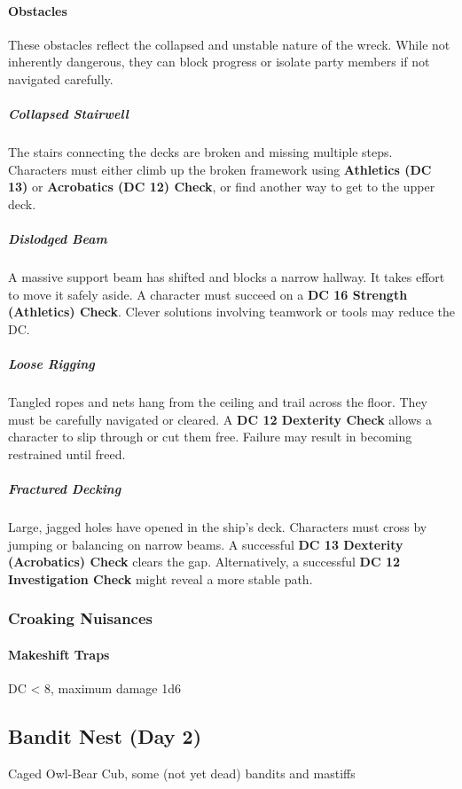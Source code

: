{\entryfont \paragraph*{Obstacles} These obstacles reflect the collapsed and unstable nature of the wreck. While not inherently dangerous, they can block progress or isolate party members if not navigated carefully.
\subparagraph*{Collapsed Stairwell} The stairs connecting the decks are broken and missing multiple steps. Characters must either climb up the broken framework using \textbf{Athletics (DC 13)} or \textbf{Acrobatics (DC 12) Check}, or find another way to get to the upper deck.
\subparagraph*{Dislodged Beam} A massive support beam has shifted and blocks a narrow hallway. It takes effort to move it safely aside. A character must succeed on a \textbf{DC 16 Strength (Athletics) Check}. Clever solutions involving teamwork or tools may reduce the DC.
\subparagraph*{Loose Rigging} Tangled ropes and nets hang from the ceiling and trail across the floor. They must be carefully navigated or cleared. A \textbf{DC 12 Dexterity Check} allows a character to slip through or cut them free. Failure may result in becoming restrained until freed.
\subparagraph*{Fractured Decking} Large, jagged holes have opened in the ship's deck. Characters must cross by jumping or balancing on narrow beams. A successful \textbf{DC 13 Dexterity (Acrobatics) Check} clears the gap. Alternatively, a successful \textbf{DC 12 Investigation Check} might reveal a more stable path.
}

\subsubsection*{Croaking Nuisances}

{\entryfont \paragraph*{Makeshift Traps} DC < 8, maximum damage 1d6}

\subsection*{Bandit Nest (Day 2)}
Caged Owl-Bear Cub, some (not yet dead) bandits and mastiffs